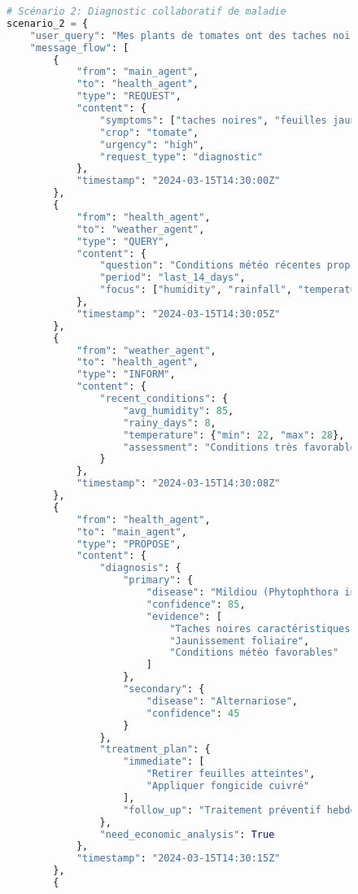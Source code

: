\begin{figure}[H]
\begin{lstlisting}[language=Python, caption=Exemples de communications inter-agents en action]
# Scénario 2: Diagnostic collaboratif de maladie
scenario_2 = {
    "user_query": "Mes plants de tomates ont des taches noires et les feuilles jaunissent",
    "message_flow": [
        {
            "from": "main_agent",
            "to": "health_agent",
            "type": "REQUEST",
            "content": {
                "symptoms": ["taches noires", "feuilles jaunes"],
                "crop": "tomate",
                "urgency": "high",
                "request_type": "diagnostic"
            },
            "timestamp": "2024-03-15T14:30:00Z"
        },
        {
            "from": "health_agent",
            "to": "weather_agent",
            "type": "QUERY",
            "content": {
                "question": "Conditions météo récentes propices maladies fongiques?",
                "period": "last_14_days",
                "focus": ["humidity", "rainfall", "temperature"]
            },
            "timestamp": "2024-03-15T14:30:05Z"
        },
        {
            "from": "weather_agent",
            "to": "health_agent",
            "type": "INFORM",
            "content": {
                "recent_conditions": {
                    "avg_humidity": 85,
                    "rainy_days": 8,
                    "temperature": {"min": 22, "max": 28},
                    "assessment": "Conditions très favorables champignons"
                }
            },
            "timestamp": "2024-03-15T14:30:08Z"
        },
        {
            "from": "health_agent",
            "to": "main_agent",
            "type": "PROPOSE",
            "content": {
                "diagnosis": {
                    "primary": {
                        "disease": "Mildiou (Phytophthora infestans)",
                        "confidence": 85,
                        "evidence": [
                            "Taches noires caractéristiques",
                            "Jaunissement foliaire",
                            "Conditions météo favorables"
                        ]
                    },
                    "secondary": {
                        "disease": "Alternariose",
                        "confidence": 45
                    }
                },
                "treatment_plan": {
                    "immediate": [
                        "Retirer feuilles atteintes",
                        "Appliquer fongicide cuivré"
                    ],
                    "follow_up": "Traitement préventif hebdomadaire"
                },
                "need_economic_analysis": True
            },
            "timestamp": "2024-03-15T14:30:15Z"
        },
        {

\end{lstlisting}
\end{figure}
